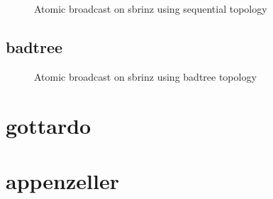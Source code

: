\begin{figure}[ht!]

\caption{Atomic broadcast on sbrinz using sequential topology}
\label{fig:ab_sbrinz_sequential}
\end{figure}
\clearpage\subsection{badtree}

\begin{figure}[ht!]

\caption{Atomic broadcast on sbrinz using badtree topology}
\label{fig:ab_sbrinz_badtree}
\end{figure}
\clearpage\newpage\clearpage\section{gottardo}

\newpage\clearpage\section{appenzeller}

